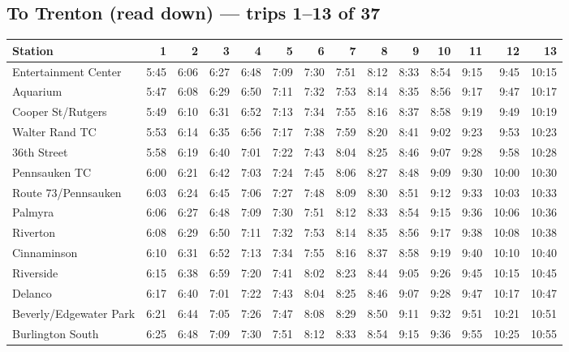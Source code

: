 \subsection*{To Trenton (read down) --- trips 1--13 of 37}
\begin{center}\footnotesize\setlength{\tabcolsep}{3pt}\begin{tabular}{@{}lrrrrrrrrrrrrr@{}}\toprule
Station & 1 & 2 & 3 & 4 & 5 & 6 & 7 & 8 & 9 & 10 & 11 & 12 & 13 \\\midrule
Entertainment Center & 5:45 & 6:06 & 6:27 & 6:48 & 7:09 & 7:30 & 7:51 & 8:12 & 8:33 & 8:54 & 9:15 & 9:45 & 10:15 \\
Aquarium & 5:47 & 6:08 & 6:29 & 6:50 & 7:11 & 7:32 & 7:53 & 8:14 & 8:35 & 8:56 & 9:17 & 9:47 & 10:17 \\
Cooper St/Rutgers & 5:49 & 6:10 & 6:31 & 6:52 & 7:13 & 7:34 & 7:55 & 8:16 & 8:37 & 8:58 & 9:19 & 9:49 & 10:19 \\
Walter Rand TC & 5:53 & 6:14 & 6:35 & 6:56 & 7:17 & 7:38 & 7:59 & 8:20 & 8:41 & 9:02 & 9:23 & 9:53 & 10:23 \\
36th Street & 5:58 & 6:19 & 6:40 & 7:01 & 7:22 & 7:43 & 8:04 & 8:25 & 8:46 & 9:07 & 9:28 & 9:58 & 10:28 \\
Pennsauken TC & 6:00 & 6:21 & 6:42 & 7:03 & 7:24 & 7:45 & 8:06 & 8:27 & 8:48 & 9:09 & 9:30 & 10:00 & 10:30 \\
Route 73/Pennsauken & 6:03 & 6:24 & 6:45 & 7:06 & 7:27 & 7:48 & 8:09 & 8:30 & 8:51 & 9:12 & 9:33 & 10:03 & 10:33 \\
Palmyra & 6:06 & 6:27 & 6:48 & 7:09 & 7:30 & 7:51 & 8:12 & 8:33 & 8:54 & 9:15 & 9:36 & 10:06 & 10:36 \\
Riverton & 6:08 & 6:29 & 6:50 & 7:11 & 7:32 & 7:53 & 8:14 & 8:35 & 8:56 & 9:17 & 9:38 & 10:08 & 10:38 \\
Cinnaminson & 6:10 & 6:31 & 6:52 & 7:13 & 7:34 & 7:55 & 8:16 & 8:37 & 8:58 & 9:19 & 9:40 & 10:10 & 10:40 \\
Riverside & 6:15 & 6:38 & 6:59 & 7:20 & 7:41 & 8:02 & 8:23 & 8:44 & 9:05 & 9:26 & 9:45 & 10:15 & 10:45 \\
Delanco & 6:17 & 6:40 & 7:01 & 7:22 & 7:43 & 8:04 & 8:25 & 8:46 & 9:07 & 9:28 & 9:47 & 10:17 & 10:47 \\
Beverly/Edgewater Park & 6:21 & 6:44 & 7:05 & 7:26 & 7:47 & 8:08 & 8:29 & 8:50 & 9:11 & 9:32 & 9:51 & 10:21 & 10:51 \\
Burlington South & 6:25 & 6:48 & 7:09 & 7:30 & 7:51 & 8:12 & 8:33 & 8:54 & 9:15 & 9:36 & 9:55 & 10:25 & 10:55 \\

\end{tabular}
\end{center}
